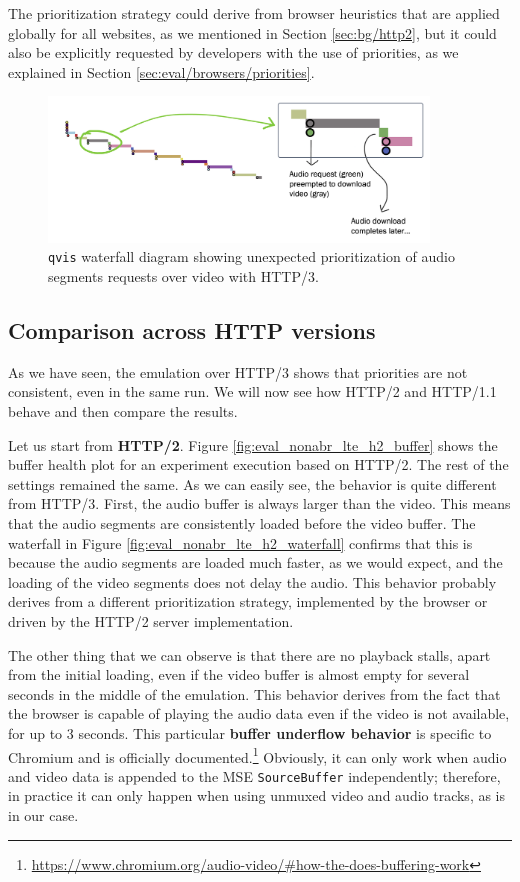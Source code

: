 The prioritization strategy could derive from browser heuristics that are applied globally for all websites, as we mentioned in Section \ref{sec:bg/http2}, but it could also be explicitly requested by developers with the use of priorities, as we explained in Section \ref{sec:eval/browsers/priorities}.

\begin{figure}[h]
    \centering
    \includegraphics[width=0.9\textwidth]{res/eval_nonabr_qvis2.png}
    \caption{\texttt{qvis} waterfall diagram showing unexpected prioritization of audio segments requests over video with HTTP/3.}
    \label{fig:eval_noabr_qvis2}
\end{figure}

\subsection{Comparison across HTTP versions}
\label{sec:eval/non-abr/http-versions}

As we have seen, the emulation over HTTP/3 shows that priorities are not consistent, even in the same run. We will now see how HTTP/2 and HTTP/1.1 behave and then compare the results.

Let us start from \textbf{HTTP/2}. Figure \ref{fig:eval_nonabr_lte_h2_buffer} shows the buffer health plot for an experiment execution based on HTTP/2. The rest of the settings remained the same. As we can easily see, the behavior is quite different from HTTP/3. First, the audio buffer is always larger than the video. This means that the audio segments are consistently loaded before the video buffer. The waterfall in Figure \ref{fig:eval_nonabr_lte_h2_waterfall} confirms that this is because the audio segments are loaded much faster, as we would expect, and the loading of the video segments does not delay the audio. This behavior probably derives from a different prioritization strategy, implemented by the browser or driven by the HTTP/2 server implementation.

The other thing that we can observe is that there are no playback stalls, apart from the initial loading, even if the video buffer is almost empty for several seconds in the middle of the emulation. This behavior derives from the fact that the browser is capable of playing the audio data even if the video is not available, for up to 3 seconds. This particular \textbf{buffer underflow behavior} is specific to Chromium and is officially documented.\footnote{\url{https://www.chromium.org/audio-video/\#how-the-does-buffering-work}} Obviously, it can only work when audio and video data is appended to the MSE \texttt{SourceBuffer} independently; therefore, in practice it can only happen when using unmuxed video and audio tracks, as is in our case.

